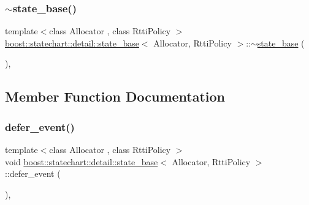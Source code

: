 \mbox{\label{classboost_1_1statechart_1_1detail_1_1state__base_a9092e4033508839cd796ef17625f7952}} 
\subsubsection{\texorpdfstring{$\sim$state\+\_\+base()}{~state\_base()}}
{\footnotesize\ttfamily template$<$class Allocator , class Rtti\+Policy $>$ \\
\mbox{\hyperlink{classboost_1_1statechart_1_1detail_1_1state__base}{boost\+::statechart\+::detail\+::state\+\_\+base}}$<$ Allocator, Rtti\+Policy $>$\+::$\sim$\mbox{\hyperlink{classboost_1_1statechart_1_1detail_1_1state__base}{state\+\_\+base}} (\begin{DoxyParamCaption}{ }\end{DoxyParamCaption})\hspace{0.3cm}{\ttfamily [inline]}, {\ttfamily [protected]}}



\subsection{Member Function Documentation}
\mbox{\label{classboost_1_1statechart_1_1detail_1_1state__base_ad5d457512772c7435a988e3cb8ae80c8}} 
\subsubsection{\texorpdfstring{defer\+\_\+event()}{defer\_event()}}
{\footnotesize\ttfamily template$<$class Allocator , class Rtti\+Policy $>$ \\
void \mbox{\hyperlink{classboost_1_1statechart_1_1detail_1_1state__base}{boost\+::statechart\+::detail\+::state\+\_\+base}}$<$ Allocator, Rtti\+Policy $>$\+::defer\+\_\+event (\begin{DoxyParamCaption}{ }\end{DoxyParamCaption})\hspace{0.3cm}{\ttfamily [inline]}, {\ttfamily [protected]}}

